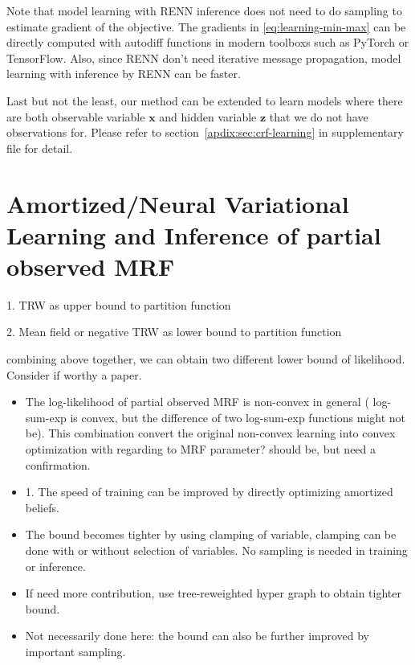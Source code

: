Note that model learning with RENN inference does not need to do sampling to estimate gradient of the objective. The gradients in \eqref{eq:learning-min-max} can be directly computed with autodiff functions in modern toolboxs such as PyTorch or TensorFlow. {Also, since RENN don't need iterative message propagation, model learning with inference by RENN can be faster.}

Last but not the least, our method can be extended to learn models where there are both observable variable $\bm{x}$ and hidden variable $\bm{z}$ that we do not have observations for. Please refer to section~\ref{apdix:sec:crf-learning} in supplementary file for detail.


\section{Amortized/Neural Variational Learning and Inference of partial observed MRF}
1. TRW as upper bound to partition function

2. Mean field or negative TRW as lower bound to partition function

combining above together, we can obtain two different lower bound of likelihood. Consider if worthy a paper.

\begin{itemize}
\item The log-likelihood of partial observed MRF is non-convex in general ( log-sum-exp is convex, but the difference of two log-sum-exp functions might not be). This combination convert the original non-convex learning into convex optimization with regarding to MRF parameter? should be, but need a confirmation.
\item 1. The speed of training can be improved by directly optimizing amortized beliefs.
\item The bound becomes tighter by using clamping of variable, clamping can be done with or without selection of variables. No sampling is needed in training or inference.
\item If need more contribution, use tree-reweighted hyper graph to obtain tighter bound.
  
\item Not necessarily done here: the bound can also be further improved by important sampling.
\end{itemize}

